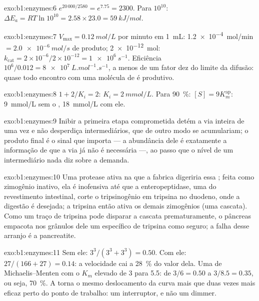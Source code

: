 \begin{solution}{exo:b1:enzymes:6}
$e^{20\,000/2580} = e^{7.75} = 2300$. Para $10^{10}$: $\Delta E_a =
RT\ln 10^{10} = 2.58\times 23.0 = \qty{59}{kJ/mol}$.
\end{solution}

\begin{solution}{exo:b1:enzymes:7}
$V_{\max} = \qty{0.12}{mol/L}$ por minuto em \qty{1}{mL}:
\qty{1.2e-4}{mol/min} $= \qty{2.0e-6}{mol/s}$ de produto; 
\qty{2e-12}{mol}: $k_{\text{cat}} = 2\times 10^{-6}/2\times 10^{-12} =
\qty{1e6}{s^{-1}}$. Eficiência $10^6/0.012 = \qty{8e7}{L.mol^{-1}.s^{-1}}$,
a menos de um fator dez do limite da difusão: quase todo encontro com
uma molécula de  é produtivo.
\end{solution}

\begin{solution}{exo:b1:enzymes:8}
$1 + 2/K_i = 2$: $K_i = \qty{2}{mmol/L}$. Para \qty{90}{\%}:
$[S] = 9K_m^{\text{ap}}$: \qty{9}{mmol/L} sem o ,
\qty{18}{mmol/L} com ele.
\end{solution}

\begin{solution}{exo:b1:enzymes:9}
Inibir a primeira etapa comprometida detém a via inteira de uma vez e
não desperdiça intermediários, que de outro modo se acumulariam; o
produto final é o sinal que importa --- a abundância dele é exatamente a
informação de que a via já não é necessária ---, ao passo que o nível de
um intermediário nada diz sobre a demanda.
\end{solution}

\begin{solution}{exo:b1:enzymes:10}
Uma protease ativa na  que a fabrica digeriria essa ; feita
como zimogênio inativo, ela é inofensiva até que a enteropeptidase, uma
 do revestimento intestinal, corte o tripsinogênio em tripsina no
duodeno, onde a digestão é desejada; a tripsina então ativa os demais
zimogênios (uma cascata). Como um traço de tripsina pode disparar a
cascata prematuramente, o pâncreas empacota nos grânulos dele um
 específico de tripsina como seguro; a falha desse arranjo é a
pancreatite.
\end{solution}

\begin{solution}{exo:b1:enzymes:11}
Sem ele: $3^3/(3^3 + 3^3) = 0.50$. Com ele: $27/(166 + 27) = 0.14$: a
velocidade cai a \qty{28}{\%} do valor dela. Uma  de
Michaelis--Menten com o $K_m$ elevado de 3 para 5.5: de $3/6 = 0.50$ a
$3/8.5 = 0.35$, ou seja, \qty{70}{\%}. A  torna o mesmo
deslocamento da curva mais que duas vezes mais eficaz perto do ponto de
trabalho: um interruptor, e não um dimmer.
\end{solution}

